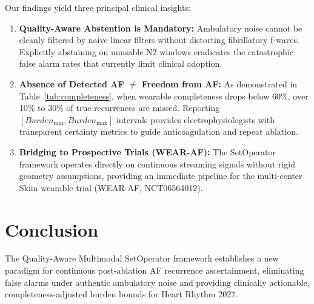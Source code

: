 \documentclass[10pt,twocolumn,letterpaper]{article}
\begin{document}
Our findings yield three principal clinical insights:
\begin{enumerate}
    \item \textbf{Quality-Aware Abstention is Mandatory:} Ambulatory noise cannot be cleanly filtered by naive linear filters without distorting fibrillatory f-waves. Explicitly abstaining on unusable N2 windows eradicates the catastrophic false alarm rates that currently limit clinical adoption.
    \item \textbf{Absence of Detected AF $\neq$ Freedom from AF:} As demonstrated in Table~\ref{tab:completeness}, when wearable completeness drops below 60\%, over 10\% to 30\% of true recurrences are missed. Reporting $[Burden_{\min}, Burden_{\max}]$ intervals provides electrophysiologists with transparent certainty metrics to guide anticoagulation and repeat ablation.
    \item \textbf{Bridging to Prospective Trials (WEAR-AF):} The SetOperator framework operates directly on continuous streaming signals without rigid geometry assumptions, providing an immediate pipeline for the multi-center Skiin wearable trial (WEAR-AF, NCT06564012).
\end{enumerate}

\section{Conclusion}
The Quality-Aware Multimodal SetOperator framework establishes a new paradigm for continuous post-ablation AF recurrence ascertainment, eliminating false alarms under authentic ambulatory noise and providing clinically actionable, completeness-adjusted burden bounds for Heart Rhythm 2027.



\end{document}
